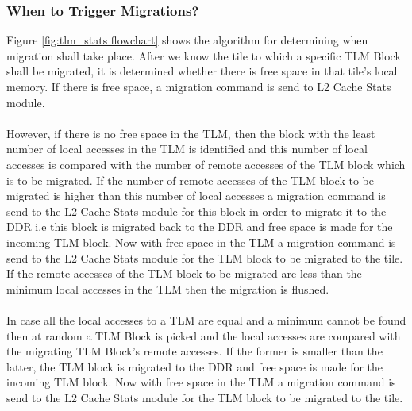 \documentclass{listhesis}
\begin{document}
\subsubsection{When to Trigger Migrations?}
Figure \ref{fig:tlm_stats flowchart} shows the algorithm for determining when migration shall take place. After we know the tile to which a specific TLM Block shall be migrated, it is determined whether there is free space in that tile's local memory. If there is free space, a migration command is send to L2 Cache Stats module. \\
\\
However, if there is no free space in the TLM, then the block with the least number of local accesses in the TLM is identified and this number of local accesses is compared with the number of remote accesses of the TLM block which is to be migrated. If the number of remote accesses of the TLM block to be migrated is higher than this number of local accesses a migration command is send to the L2 Cache Stats module for this block in-order to migrate it to the DDR i.e this block is migrated back to the DDR and free space is made for the incoming TLM block. Now with free space in the TLM a migration command is send to the  L2 Cache Stats module for the TLM block to be migrated to the tile. If the remote accesses of the TLM block to be migrated are less than the minimum local accesses in the TLM then the migration is flushed.\\
\\
In case all the local accesses to a TLM are equal and a minimum cannot be found then at random a TLM Block is picked and the local accesses are compared with the migrating TLM Block's remote accesses. If the former is smaller than the latter, the TLM block is migrated to the DDR and free space is made for the incoming TLM block. Now with free space in the TLM a migration command is send to the  L2 Cache Stats module for the TLM block to be migrated to the tile. \\
\end{document}
